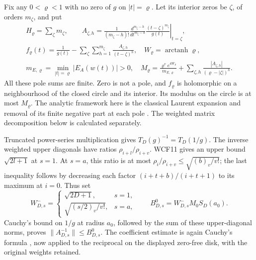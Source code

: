 \documentclass[11pt,a4paper]{article}
\begin{document}
Fix any $0<\varrho<1$ with no zero of $g$ on $|t|=\varrho$.
Let its interior zeros be $\zeta$, of orders $m_\zeta$, and put
\[
\begin{gathered}
 H_\varrho=\sum_\zeta m_\zeta,\qquad
 A_{\zeta,h}=\frac1{(m_\zeta-h)!}
   \left.\frac{d^{m_\zeta-h}}{dt^{m_\zeta-h}}
       \frac{(t-\zeta)^{m_\zeta}}{g(t)}\right|_{t=\zeta},\\
 f_\varrho(t)=\frac1{g(t)}-
       \sum_{\zeta}\sum_{h=1}^{m_\zeta}\frac{A_{\zeta,h}}{(t-\zeta)^h},
 \quad W_\varrho=\operatorname{arctanh}\varrho,\\
 m_{E,\varrho}=\min_{|t|=\varrho}|E_A(w(t))|>0,\quad
 M_\varrho=\frac{\varrho^ve^{4W_\varrho}}{m_{E,\varrho}}
       +\sum_{\zeta,h}\frac{|A_{\zeta,h}|}{(\varrho-|\zeta|)^h}.
\end{gathered}\tag{WCF15}
\]
All these pole sums are finite. Zero is not a pole, and $f_\varrho$
is holomorphic on a neighbourhood of the closed circle and its
interior. Its modulus on the circle is at most $M_\varrho$.
The analytic framework here is the classical Laurent expansion and
removal of its finite negative part at each pole
\cite[\S1.10(iii), eqs.~(1.10.6)--(1.10.7)]{human:dlmf1}.
The weighted matrix decomposition below is calculated separately.

Truncated power-series multiplication gives
$T_D(g)^{-1}=T_D(1/g)$. The inverse weighted upper diagonals have
ratios $\rho_{i+l}/\rho_{i+v}$. WCF11 gives an upper bound
$\sqrt{2l+1}$ at $s=1$. At $s=a$, this ratio is at most
$\rho_i/\rho_{i+v}\le\sqrt{(b)_v/v!}$; the last inequality follows
by decreasing each factor $(i+t+b)/(i+t+1)$ to its maximum at $i=0$.
Thus set
\[
 W_{D,s}^-=
 \begin{cases}\sqrt{2D+1},&s=1,\\\sqrt{(s/2)_v/v!},&s=a,
 \end{cases}
 \qquad B^0_{D,s}=W_{D,s}^-M_0S_D(a_0).
 \tag{WCF16}
\]
Cauchy's bound on $1/g$ at radius $a_0$, followed by the sum of
these upper-diagonal norms, proves $\|A_{D,s}^{-1}\|\le B^0_{D,s}$.
The coefficient estimate is again Cauchy's formula
\cite[eqs.~(1.9.30)--(1.9.31)]{human:dlmf1}, now applied to the reciprocal
on the displayed zero-free disk, with the original weights retained.
\end{document}
